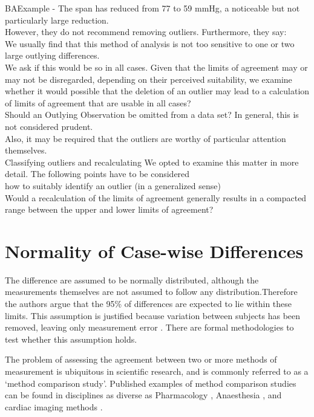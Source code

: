 \documentclass[12pt, a4paper]{report}
\theoremstyle{plain}
\theoremstyle{definition}
\theoremstyle{remark}
\begin{document}
BAExample -	The span has reduced from 77 to 59 mmHg, a noticeable but not
	particularly large reduction.
	\\
	However, they do not recommend removing outliers. Furthermore,
	they say:
	\\
	We usually find that this method of analysis is not too sensitive
	to one or two large outlying differences.
	\\
	We ask if this would be so in all cases. Given that the limits of
	agreement may or may not be disregarded, depending on their
	perceived suitability, we examine whether it would possible that
	the deletion of an outlier may lead to a calculation of limits of
	agreement that are usable in all cases?
	\\
	Should an Outlying Observation be omitted from a data set? In
	general, this is not considered prudent.
	\\
	Also, it may be required that the outliers are worthy of
	particular attention themselves.
	\\
	Classifying outliers and recalculating We opted to examine this
	matter in more detail. The following points have to be considered
	\\how to suitably identify an outlier (in a generalized sense)
	\\Would a recalculation of the limits of agreement generally
	results in  a compacted range between the upper and lower limits
	of agreement?



	


	\section{Normality of Case-wise Differences}
	
	The difference are assumed to be normally distributed, although the measurements themselves are not assumed to follow any distribution.Therefore the authors argue that the 95\% of differences are expected to lie within these limits. This assumption is justified because variation between subjects has been removed, leaving only measurement error \citep{BA86}. There are formal methodologies to test whether this assumption holds.
	
	
	The problem of assessing the agreement between two or more methods
	of measurement is ubiquitous in scientific research, and is
	commonly referred to as a `method comparison study'. Published
	examples of method comparison studies can be found in disciplines
	as diverse as Pharmacology \citep{ludbrook97}, Anaesthesia
	\citep{Myles}, and cardiac imaging methods \citep{Krumm}.
	\smallskip
	
\end{document}
